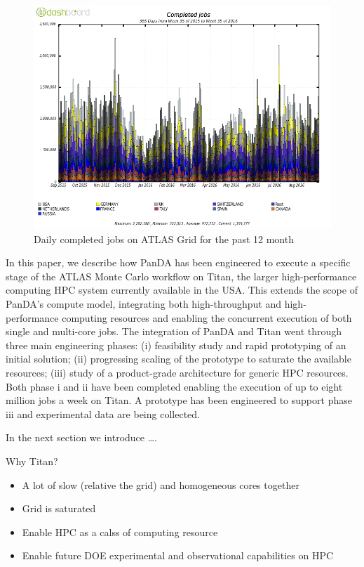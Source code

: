 \begin{figure}
    \begin{center}
        \includegraphics[width=\columnwidth]{figures/DailyJobs.png}
        \caption{Daily completed jobs on ATLAS Grid for the past 12 month}
    \end{center}
\label{fig:daily}
\end{figure}

In this paper, we describe how PanDA has been engineered to execute a specific
stage of the ATLAS Monte Carlo workflow on Titan, the larger high-performance
computing HPC system currently available in the USA\@. This extends
the scope of PanDA's compute model, integrating both high-throughput and
high-performance computing resources and enabling the concurrent execution of
both  single and multi-core jobs. The integration of PanDA and Titan went
through three main engineering phases: (i) feasibility study and rapid
prototyping of an initial solution; (ii) progressing scaling of the  prototype
to saturate the available resources; (iii) study of a product-grade architecture
for generic HPC resources. Both phase i and ii have been completed enabling the
execution of up to eight million jobs a week on Titan. A prototype has been
engineered to support phase iii and experimental data are being collected.

In the next section we introduce \ldots.

Why Titan?
\begin{itemize}
    \item A lot of slow (relative the grid) and homogeneous cores together
    \item Grid is saturated
    \item Enable HPC as a calss of computing resource
    \item Enable future DOE experimental and observational capabilities on HPC
\end{itemize}
